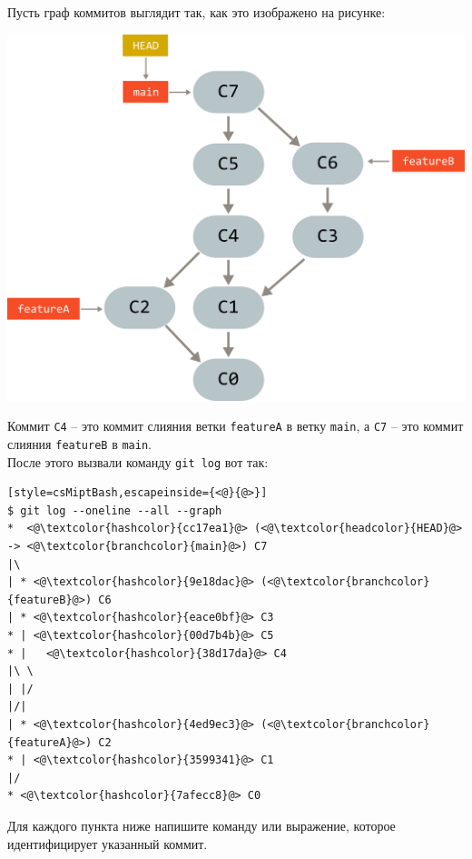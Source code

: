 \documentclass{article}
\begin{document}
Пусть граф коммитов выглядит так, как это изображено на рисунке:
\begin{center}
\includegraphics[scale=0.8]{../images/graph_with_merges.png}
\end{center}
Коммит \texttt{C4} -- это коммит слияния ветки \texttt{featureA} в ветку \texttt{main}, а \texttt{C7} -- это коммит слияния \texttt{featureB} в \texttt{main}. \\
После этого вызвали команду \texttt{git log} вот так:
\begin{lstlisting}[style=csMiptBash,escapeinside={<@}{@>}]
$ git log --oneline --all --graph
*  <@\textcolor{hashcolor}{cc17ea1}@> (<@\textcolor{headcolor}{HEAD}@> -> <@\textcolor{branchcolor}{main}@>) C7
|\
| * <@\textcolor{hashcolor}{9e18dac}@> (<@\textcolor{branchcolor}{featureB}@>) C6
| * <@\textcolor{hashcolor}{eace0bf}@> C3
* | <@\textcolor{hashcolor}{00d7b4b}@> C5
* |   <@\textcolor{hashcolor}{38d17da}@> C4
|\ \
| |/
|/|
| * <@\textcolor{hashcolor}{4ed9ec3}@> (<@\textcolor{branchcolor}{featureA}@>) C2
* | <@\textcolor{hashcolor}{3599341}@> C1
|/
* <@\textcolor{hashcolor}{7afecc8}@> C0
\end{lstlisting}
Для каждого пункта ниже напишите команду или выражение, которое идентифицирует указанный коммит.
\end{document}

